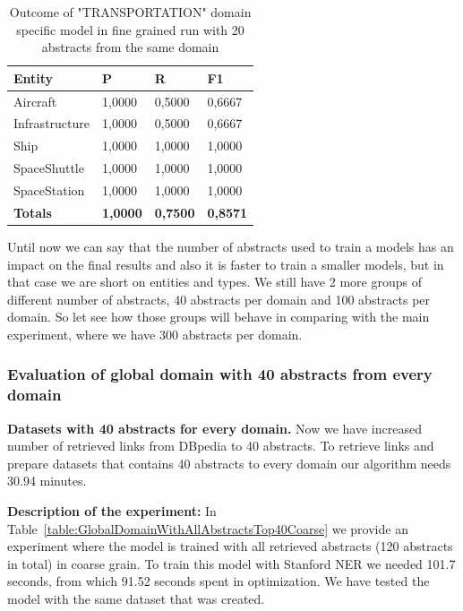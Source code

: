 \documentclass[thesis=M,english]{FITthesis}[2018/05/30]
\begin{document}
	\begin{table}[H]\centering
		\begin{tabular}{|l|l|l|l|}
			\hline {\textbf{Entity}} & {\textbf{P}} & {\textbf{R}} & {\textbf{F1}}\\\hline
				Aircraft & 1,0000 & 0,5000 & 0,6667\\
				Infrastructure & 1,0000 & 0,5000 & 0,6667\\
				Ship & 1,0000 & 1,0000 & 1,0000\\				
				SpaceShuttle & 1,0000 & 1,0000 & 1,0000\\
				SpaceStation & 1,0000 & 1,0000 & 1,0000\\\hline
				\textbf{Totals} & \textbf{1,0000} & \textbf{0,7500} & \textbf{0,8571}\\\hline
		\end{tabular}
		\caption{Outcome of "TRANSPORTATION" domain specific model in fine grained run with 20 abstracts from the same domain \label{table:TransportationDomainWithTransportationTop20Fine}}			
	\end{table}
	
	Until now we can say that the number of abstracts used to train a models has an impact on the final results and also it is faster to train a smaller models, but in that case we are short on entities and types. We still have 2 more groups of different number of abstracts, 40 abstracts per domain and 100 abstracts per domain. So let see how those groups will behave in comparing with the main experiment, where we have 300 abstracts per domain. 

\subsubsection{Evaluation of global domain with 40 abstracts from every domain }

\textbf{Datasets with 40 abstracts for every domain.} Now we have increased number of retrieved links from DBpedia to 40 abstracts. To retrieve links and prepare datasets that contains 40 abstracts to every domain our algorithm needs 30.94 minutes.

	\textbf{Description of the experiment:} In Table~\ref{table:GlobalDomainWithAllAbstractsTop40Coarse} we provide an experiment where the model is trained with all retrieved abstracts (120 abstracts in total) in coarse grain. To train this model with Stanford NER we needed 101.7 seconds, from which 91.52 seconds spent in optimization. We have tested the model with the same dataset that was created. 
\end{document}
